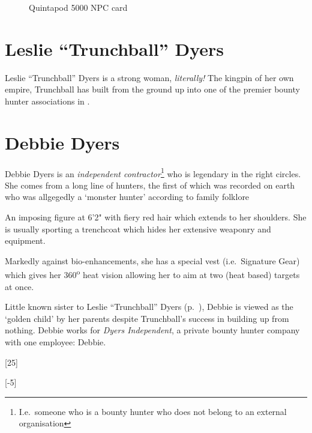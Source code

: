 \begin{figure*}
  \centering
  \caption{Quintapod 5000 NPC card}
  \label{fig:quintapod-npc-card}
\end{figure*}

\section{Leslie ``Trunchball'' Dyers}
\label{sec:lesl-trunchb-dyers}

Leslie ``Trunchball'' Dyers is a strong woman, \emph{literally!} The kingpin of
her own empire, Trunchball has built \thecompany from the ground up into one of
the premier bounty hunter associations in .

\begin{character}
     

\end{character}

\section{Debbie Dyers}
\label{sec:debbie-dyers}

Debbie Dyers is an \emph{independent contractor}\footnote{I.e.~someone who is a
  bounty hunter who does not belong to an external organisation} who is
legendary in the right circles. She comes from a long line of hunters, the first
of which was recorded on earth who was allgegedly a `monster hunter' according
to family folklore

An imposing figure at 6'2" with fiery red hair which extends to her shoulders.
She is usually sporting a trenchcoat which hides her extensive weaponry and
equipment.

Markedly against bio-enhancements, she has a special vest (i.e.~Signature Gear)
which gives her 360\textsuperscript{o} heat vision allowing her to aim at
two (heat based) targets at once.

Little known sister to Leslie ``Trunchball'' Dyers
(p.~\pageref{sec:lesl-trunchb-dyers}), Debbie is viewed as the `golden child' by her
parents despite Trunchball's success in building \thecompany up from nothing.
Debbie works for \emph{Dyers Independent}, a private bounty hunter company with
one employee: Debbie.

\begin{character}
     


  [25]

  [-5]

\end{character}


